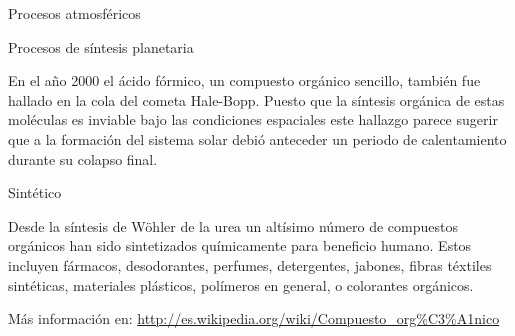 \documentclass[12pt,letterpaper]{article}
\begin{document}
Procesos atmosféricos

Procesos de síntesis planetaria

En el año 2000 el ácido fórmico, un compuesto orgánico sencillo, también fue hallado en la cola del cometa Hale-Bopp. Puesto que la síntesis orgánica de estas moléculas es inviable bajo las condiciones espaciales este hallazgo parece sugerir que a la formación del sistema solar debió anteceder un periodo de calentamiento durante su colapso final.

Sintético

Desde la síntesis de Wöhler de la urea un altísimo número de compuestos orgánicos han sido sintetizados químicamente para beneficio humano. Estos incluyen fármacos, desodorantes, perfumes, detergentes, jabones, fibras téxtiles sintéticas, materiales plásticos, polímeros en general, o colorantes orgánicos.

Más información en: \url{http://es.wikipedia.org/wiki/Compuesto_org\%C3\%A1nico}
\end{document}
